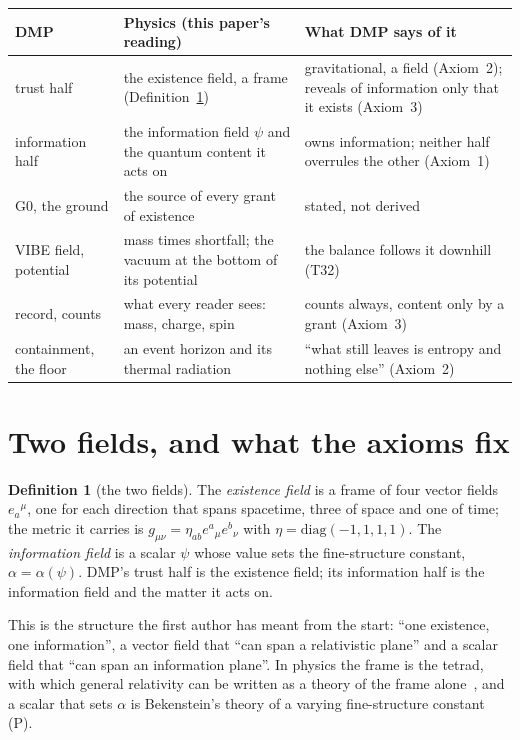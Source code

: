 \documentclass[11pt,a4paper]{article}
\theoremstyle{definition}
\newtheorem{definition}{Definition}
\newcommand{\tagP}{\textsf{(P)}}
\begin{document}
\begin{center}\small
\begin{tabularx}{\linewidth}{@{}lLL@{}}
\toprule
DMP & Physics (this paper's reading) & What DMP says of it \\
\midrule
trust half & the existence field, a frame (Definition~\ref{def:fields}) & gravitational, a field (Axiom~2); reveals of information only that it exists (Axiom~3) \\
information half & the information field $\psi$ and the quantum content it acts on & owns information; neither half overrules the other (Axiom~1) \\
G0, the ground & the source of every grant of existence & stated, not derived \\
VIBE field, potential & mass times shortfall; the vacuum at the bottom of its potential & the balance follows it downhill (T32) \\
record, counts & what every reader sees: mass, charge, spin & counts always, content only by a grant (Axiom~3) \\
containment, the floor & an event horizon and its thermal radiation & ``what still leaves is entropy and nothing else'' (Axiom~2) \\
\bottomrule
\end{tabularx}
\end{center}

\section{Two fields, and what the axioms fix}\label{sec:fields}

\begin{definition}[the two fields]\label{def:fields}
The \emph{existence field} is a frame of four vector fields $e_a{}^\mu$, one for each direction that spans spacetime, three of space and one
of time; the metric it carries is $g_{\mu\nu}=\eta_{ab}e^a{}_\mu e^b{}_\nu$ with $\eta=\mathrm{diag}(-1,1,1,1)$. The \emph{information
field} is a scalar $\psi$ whose value sets the fine-structure constant, $\alpha=\alpha(\psi)$. DMP's trust half is the existence field; its
information half is the information field and the matter it acts on.
\end{definition}

\noindent This is the structure the first author has meant from the start: ``one existence, one information'', a vector field that ``can
span a relativistic plane'' and a scalar field that ``can span an information plane''. In physics the frame is the tetrad, with which
general relativity can be written as a theory of the frame alone~\cite{aldrovandi}, and a scalar that sets $\alpha$ is Bekenstein's theory
of a varying fine-structure constant~\cite{bekenstein82} \tagP.
\end{document}

